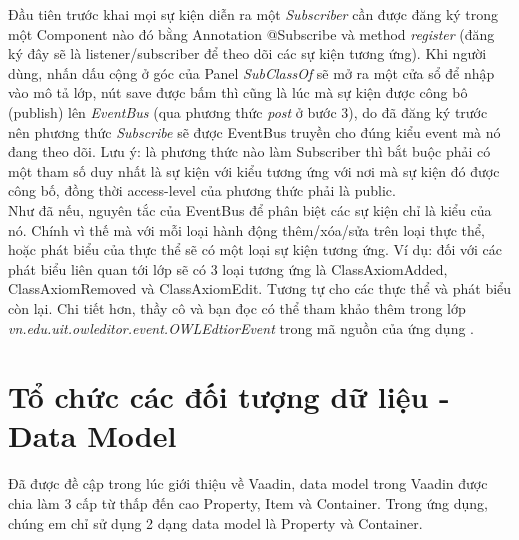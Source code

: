 Đầu tiên trước khai mọi sự kiện diễn ra một \textit{Subscriber} cần được đăng ký trong một Component nào đó bằng Annotation @Subscribe và method \textit{register} (đăng ký đây sẽ là listener/subscriber để theo dõi các sự kiện tương ứng). Khi người dùng, nhấn dấu cộng ở góc của Panel \textit{SubClassOf} sẽ mở ra một cửa sổ để nhập vào mô tả lớp, nút save được bấm thì cũng là lúc mà sự kiện được công bô (publish) lên \textit{EventBus} (qua phương thức \textit{post} ở bước 3), do đã đăng ký trước nên phương thức \textit{Subscribe} sẽ được EventBus truyền cho đúng kiểu event mà nó đang theo dõi. Lưu ý: là phương thức nào làm Subscriber thì bắt buộc phải có một tham số duy nhất là sự kiện với kiểu tương ứng với nơi mà sự kiện đó được công bố, đồng thời access-level của phương thức phải là public.
\\
Như đã nếu, nguyên tắc của EventBus để phân biệt các sự kiện chỉ là kiểu của nó. Chính vì thế mà với mỗi loại hành động thêm/xóa/sửa trên loại thực thể, hoặc phát biểu của thực thể sẽ có một loại sự kiện tương ứng. Ví dụ: đối với các phát biểu liên quan tới lớp sẽ có 3 loại tương ứng là ClassAxiomAdded, ClassAxiomRemoved và ClassAxiomEdit. Tương tự cho các thực thể và phát biểu còn lại. Chi tiết hơn, thầy cô và bạn đọc có thể tham khảo thêm trong lớp \textit{vn.edu.uit.owleditor.event.OWLEdtiorEvent} trong mã nguồn của ứng dụng \cite{owleditorSrc}.


\section{Tổ chức các đối tượng dữ liệu - Data Model}
Đã được đề cập trong lúc giới thiệu về Vaadin, data model trong Vaadin được chia làm 3 cấp từ thấp đến cao Property, Item và Container. Trong ứng dụng, chúng em chỉ sử dụng 2 dạng data model là Property và Container. 
